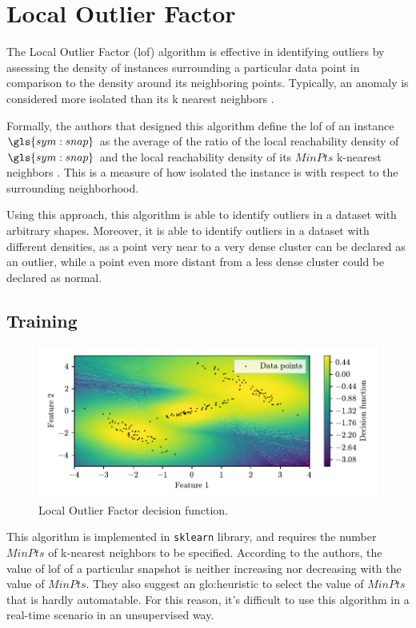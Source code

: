 \section{Local Outlier Factor}
\label{sec:LocalOutlierFactor}


The Local Outlier Factor (\gls{lof}) algorithm is effective in identifying outliers by assessing the density of instances surrounding a particular data point in comparison to the density around its neighboring points. Typically, an anomaly is considered more isolated than its k nearest neighbors . 

Formally, the authors that designed this algorithm define the \gls{lof} of an instance $\gls{sym:snap}$ as the average of the ratio of the local reachability density of $\gls{sym:snap}$ and the local reachability density of its $MinPts$ k-nearest neighbors \cite{breunig2000lof}. This is a measure of how isolated the instance is with respect to the surrounding neighborhood. 

Using this approach, this algorithm is able to identify outliers in a dataset with arbitrary shapes. Moreover, it is able to identify outliers in a dataset with different densities, as a point very near to a very dense cluster can be declared as an outlier, while a point even more distant from a less dense cluster could be declared as normal.

\subsection{Training}
\label{sec:lof_train}
\begin{figure}
    \centering
    \includegraphics{images/LOF/Figure_1.pdf}
    \caption{Local Outlier Factor decision function.}
    \label{fig:LocalOutlierFactor}
\end{figure}
This algorithm is implemented in \texttt{sklearn} library, and requires the number $MinPts$ of k-nearest neighbors to be specified. According to the authors, the value of \gls{lof} of a particular snapshot is neither increasing nor decreasing with the value of $MinPts$. They also suggest an \gls{glo:heuristic} to select the value of $MinPts$ that is hardly automatable. 
For this reason, it's difficult to use this algorithm in a real-time scenario in an unsupervised way.

